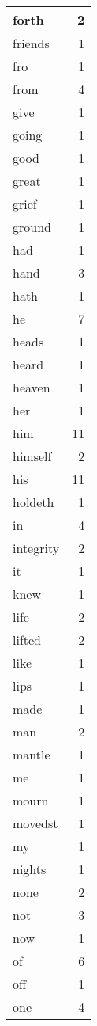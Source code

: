 \begin{center}
\begin{longtable}{l|r}
forth & 2\\ \hline 
friends & 1\\ \hline 
fro & 1\\ \hline 
from & 4\\ \hline 
give & 1\\ \hline 
going & 1\\ \hline 
good & 1\\ \hline 
great & 1\\ \hline 
grief & 1\\ \hline 
ground & 1\\ \hline 
had & 1\\ \hline 
hand & 3\\ \hline 
hath & 1\\ \hline 
he & 7\\ \hline 
heads & 1\\ \hline 
heard & 1\\ \hline 
heaven & 1\\ \hline 
her & 1\\ \hline 
him & 11\\ \hline 
himself & 2\\ \hline 
his & 11\\ \hline 
holdeth & 1\\ \hline 
in & 4\\ \hline 
integrity & 2\\ \hline 
it & 1\\ \hline 
knew & 1\\ \hline 
life & 2\\ \hline 
lifted & 2\\ \hline 
like & 1\\ \hline 
lips & 1\\ \hline 
made & 1\\ \hline 
man & 2\\ \hline 
mantle & 1\\ \hline 
me & 1\\ \hline 
mourn & 1\\ \hline 
movedst & 1\\ \hline 
my & 1\\ \hline 
nights & 1\\ \hline 
none & 2\\ \hline 
not & 3\\ \hline 
now & 1\\ \hline 
of & 6\\ \hline 
off & 1\\ \hline 
one & 4\\ \hline 

\end{longtable}
\end{center}
